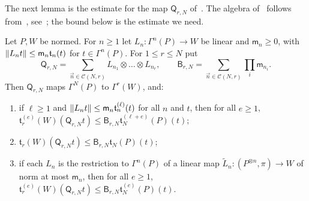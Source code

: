 The next lemma is the estimate for the map $\mathsf Q_{r,N}$ of~\cite[(Q.8)]{I}. The algebra of~\cite[(Q.8)]{I} follows from~\cite[VI~\S8, Prop.~VI.6, Cor.; Prop.~I.2; II~\S1]{Ro}, see~\cite[Section~Q.4]{I}; the bound below is the estimate we need.

\begin{lemma}[grafting]\label{dp:lem:grafting}
Let $P,W$ be normed. For $n\ge1$ let $L_n\colon\Gamma^n(P)\to W$ be linear and $\mathsf m_n\ge0$, with $\lVert L_nt\rVert\le\mathsf m_n\mathfrak t_n(t)$ for $t\in\Gamma^n(P)$. For $1\le r\le N$ put
\[
 \mathsf Q_{r,N}=\sum_{\vec n\in\mathcal C(N,r)}L_{n_1}\otimes\dots\otimes L_{n_r},\qquad
 \mathsf B_{r,N}=\sum_{\vec n\in\mathcal C(N,r)}\prod_i\mathsf m_{n_i}.
\]
Then $\mathsf Q_{r,N}$ maps $\Gamma^N(P)$ to $\Gamma^r(W)$, and:
\begin{enumerate}
\item if $\ell\ge1$ and $\lVert L_nt\rVert\le\mathsf m_n\mathfrak t^{(\ell)}_n(t)$ for all $n$ and $t$, then for all $e\ge1$, $\mathfrak t^{(e)}_r(W)(\mathsf Q_{r,N}t)\le\mathsf B_{r,N}\mathfrak t^{(\ell+e)}_N(P)(t)$;
\item $\mathfrak t_r(W)(\mathsf Q_{r,N}t)\le\mathsf B_{r,N}\mathfrak t_N(P)(t)$;
\item if each $L_n$ is the restriction to $\Gamma^n(P)$ of a linear map $\tilde L_n\colon(P^{\otimes n},\pi)\to W$ of norm at most $\mathsf m_n$, then for all $e\ge1$, $\mathfrak t^{(e)}_r(W)(\mathsf Q_{r,N}t)\le\mathsf B_{r,N}\mathfrak t^{(e)}_N(P)(t)$.
\end{enumerate}
\end{lemma}

